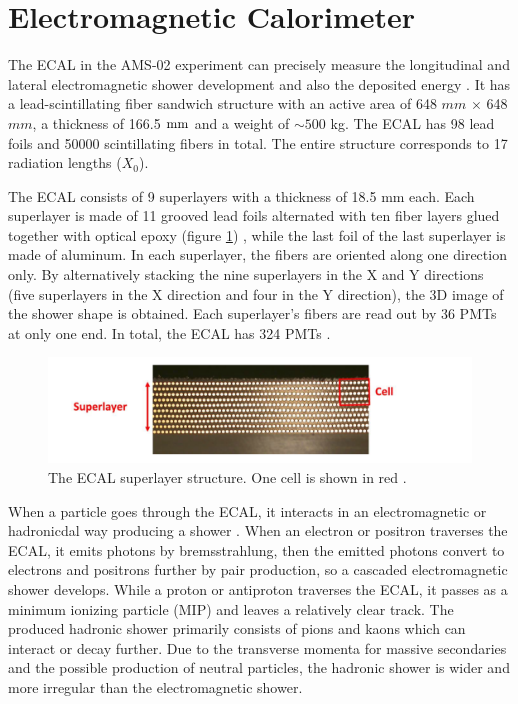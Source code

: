 
\section{Electromagnetic Calorimeter}

The ECAL in the AMS-02 experiment can precisely measure the longitudinal and lateral electromagnetic shower development and also the deposited energy \cite{ECALPaper1, ECALPaper2}. It has a lead-scintillating fiber sandwich structure with an active area of 648 $mm$ $\times$ 648 $mm$, a thickness of 166.5 $\rm{mm}$ and a weight of $\sim 500$ kg. The ECAL has 98 lead foils and 50000 scintillating fibers in total. The entire structure corresponds to 17 radiation lengths ($X_0$). \par

The ECAL consists of 9 superlayers with a thickness of 18.5 mm each. Each superlayer is made of 11 grooved lead foils alternated with ten fiber layers glued together with optical epoxy (figure \ref{ECALSuperLayer}) \cite{ECALFibres}, while the last foil of the last superlayer is made of aluminum. In each superlayer, the fibers are oriented along one direction only. By alternatively stacking the nine superlayers in the X and Y directions  (five superlayers in the X direction and four in the Y direction), the 3D image of the shower shape is obtained. Each superlayer’s fibers are read out by 36 PMTs at only one end. In total, the ECAL has 324 PMTs \cite{ECALPaper3}.   \par

\begin{figure}[h]
\centering
\includegraphics[width=1.0\textwidth, height=0.2\textheight ]{Figures/chapter3/ECAL/SuperLayer.png}
\caption[The ECAL superlayer structure.]{The ECAL superlayer structure. One cell is shown in red \cite{ECALPaper3}.}
\label{ECALSuperLayer}
\end{figure}

When a particle goes through the ECAL, it interacts in an electromagnetic or hadronicdal way producing a shower \cite{ECALShowerPaper}. When an electron or positron traverses the ECAL, it emits photons by bremsstrahlung, then the emitted photons convert to electrons and positrons further by pair production, so a cascaded electromagnetic shower develops. While a proton or antiproton traverses the ECAL, it passes as a minimum ionizing particle (MIP) and leaves a relatively clear track. The produced hadronic shower primarily consists of pions and kaons which can interact or decay further. Due to the transverse momenta for massive secondaries and the possible production of neutral particles, the hadronic shower is wider and more irregular than the electromagnetic shower.  \par 


